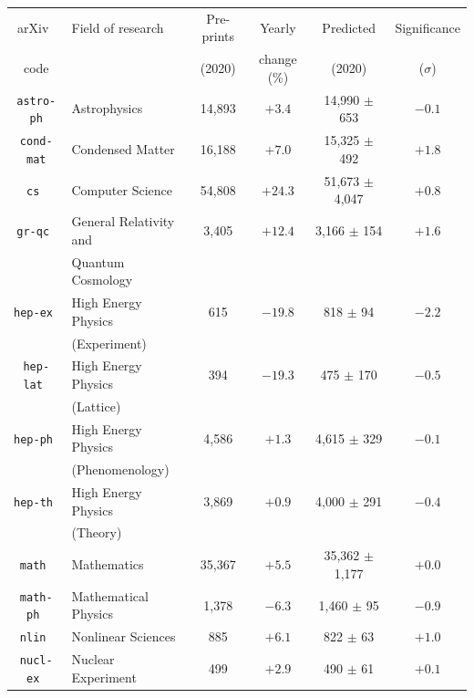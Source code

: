\documentclass[a4paper,12pt]{article}
\newcommand{\arxiv}{arXiv}
\begin{document}
\begin{table}
\begin{center}
\small
    \label{tab:table1}
    \begin{tabular}{|c|l|c|c|c|c|} 
    \hline
    	\arxiv\ & Field of research & Pre-prints & Yearly & Predicted & Significance \\
	code &&(2020)& change (\%)&(2020)&($\sigma$)\\
      \hline
\texttt{astro-ph}    & Astrophysics           & 14,893    & $ +3.4$ & 14,990 $\pm$ 653      & $-0.1$ \\
\texttt{cond-mat}    & Condensed Matter       & 16,188    & $ +7.0$ & 15,325 $\pm$ 492      & $+1.8$ \\
\texttt{cs      }    & Computer Science       & 54,808    & $+24.3$ & 51,673 $\pm$ 4,047    & $+0.8$ \\
\texttt{gr-qc   }    & General Relativity and & 3,405     & $+12.4$ & 3,166 $\pm$ 154       & $+1.6$ \\
					 & Quantum Cosmology      &&&&\\
\texttt{hep-ex  }    & High Energy Physics    & 615       & $-19.8$ & 818 $\pm$ 94          & $-2.2$ \\
                     & (Experiment)           &&&&\\
\texttt{hep-lat }    & High Energy Physics    & 394       & $-19.3$ & 475 $\pm$ 170         & $-0.5$ \\
                     & (Lattice)              &&&&\\
\texttt{hep-ph  }    & High Energy Physics    & 4,586     & $ +1.3$ & 4,615 $\pm$ 329       & $-0.1$ \\
                     & (Phenomenology)        &&&&\\
\texttt{hep-th  }    & High Energy Physics    & 3,869     & $ +0.9$ & 4,000 $\pm$ 291       & $-0.4$ \\
                     & (Theory)               &&&&\\
\texttt{math    }    & Mathematics            & 35,367    & $ +5.5$ & 35,362 $\pm$ 1,177    & $+0.0$ \\
\texttt{math-ph }    & Mathematical Physics   & 1,378     & $ -6.3$ & 1,460 $\pm$ 95        & $-0.9$ \\
\texttt{nlin    }    & Nonlinear Sciences     & 885       & $ +6.1$ & 822 $\pm$ 63          & $+1.0$ \\
\texttt{nucl-ex }    & Nuclear Experiment     & 499       & $ +2.9$ & 490 $\pm$ 61          & $+0.1$ \\

\end{tabular}
\end{center}
\end{table}
\end{document}
